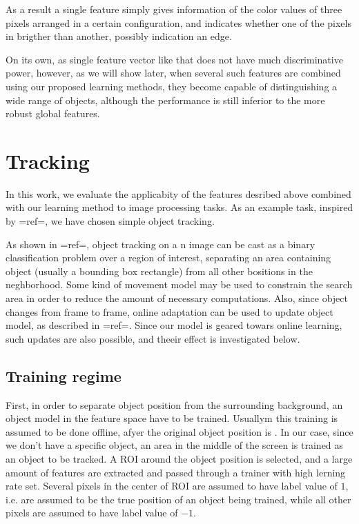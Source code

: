 As a result a single feature simply gives information of the color values of three pixels arranged in a certain configuration, and indicates whether one of the pixels in brigther than another, possibly indication an edge.

On its own, as single feature vector like that does not have much discriminative power, however, as we will show later, when several such features are combined using our proposed learning methods, they become capable of distinguishing a wide range of objects, although the performance is still inferior to the more robust global features. 
\section{Tracking}
In this work, we evaluate the applicabity of the features desribed above combined with our learning method to image processing tasks. As an example task, inspired by {{=ref=}}, we have chosen simple object tracking. 

As shown in {{=ref=}}, object tracking on a n image can be cast as a binary classification problem over a region of interest, separating an area containing object (usually a bounding box rectangle) from all other bositions in the neghborhood. Some kind of movement model may be used to constrain the search area in order to reduce the amount of necessary computations. Also, since object changes from frame to frame, online adaptation can be used to update object model, as described in {{=ref=}}. Since our model is geared towars online learning, such updates are also possible, and theeir effect is investigated below.
\subsection{Training regime}
First, in order to separate object position from the surrounding background, an object model in the feature space have to be trained. Usuallym this training is assumed to be done offline, afyer the original object position is . In our case, since we don't have a specific object, an area in the middle of the screen is trained as an object to be tracked. A ROI around the object position is selected, and a large amount of features are extracted and passed through a trainer with high lerning rate set. Several pixels in the center of ROI are assumed to have label value of $1$, i.e. are assumed to be the true position of an object being trained, while all other pixels are assumed to have label value of $-1$. 

